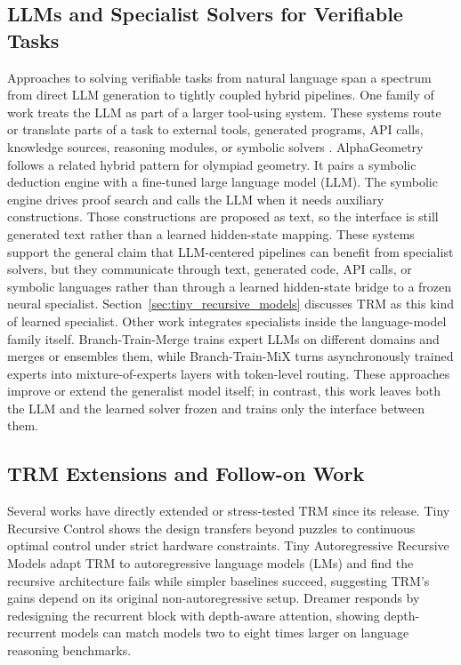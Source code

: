 \documentclass[11pt]{article}
\begin{document}
\subsection{LLMs and Specialist Solvers for Verifiable Tasks}
\label{sec:recursive_recurrent_reasoning}

Approaches to solving verifiable tasks from natural language span a spectrum from direct LLM generation to tightly coupled hybrid pipelines.
One family of work treats the LLM as part of a larger tool-using system.
These systems route or translate parts of a task to external tools, generated programs, API calls, knowledge sources, reasoning modules, or symbolic solvers \cite{karpasMRKLSystemsModular2022,parisiTALMToolAugmented2022,gaoPALProgramaidedLanguage2023,schickToolformerLanguageModels2023,panLogicLMEmpoweringLarge2023}.
AlphaGeometry \cite{trinhSolvingOlympiadGeometry2024} follows a related hybrid pattern for olympiad geometry.
It pairs a symbolic deduction engine with a fine-tuned large language model (LLM).
The symbolic engine drives proof search and calls the LLM when it needs auxiliary constructions.
Those constructions are proposed as text, so the interface is still generated text rather than a learned hidden-state mapping.
These systems support the general claim that LLM-centered pipelines can benefit from specialist solvers, but they communicate through text, generated code, API calls, or symbolic languages rather than through a learned hidden-state bridge to a frozen neural specialist.
Section~\ref{sec:tiny_recursive_models} discusses TRM as this kind of learned specialist.
Other work integrates specialists inside the language-model family itself.
Branch-Train-Merge \cite{liBranchTrainMergeEmbarrassinglyParallel2022} trains expert LLMs on different domains and merges or ensembles them, while Branch-Train-MiX \cite{sukhbaatarBranchTrainMiXMixingExpert2024} turns asynchronously trained experts into mixture-of-experts layers with token-level routing.
These approaches improve or extend the generalist model itself; in contrast, this work leaves both the LLM and the learned solver frozen and trains only the interface between them.

\subsection{TRM Extensions and Follow-on Work}
\label{sec:follow_ups}

Several works have directly extended or stress-tested TRM since its release.
Tiny Recursive Control \cite{jainTinyRecursiveControl2025} shows the design transfers beyond puzzles to continuous optimal control under strict hardware constraints.
Tiny Autoregressive Recursive Models \cite{raubaTinyAutoregressiveRecursive2026} adapt TRM to autoregressive language models (LMs) and find the recursive architecture fails while simpler baselines succeed, suggesting TRM's gains depend on its original non-autoregressive setup.
Dreamer \cite{knuppDepthRecurrentAttentionMixtures2026} responds by redesigning the recurrent block with depth-aware attention, showing depth-recurrent models can match models two to eight times larger on language reasoning benchmarks.
\end{document}
